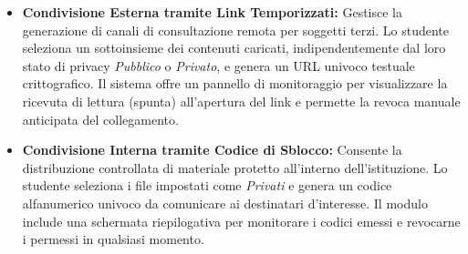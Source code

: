 \documentclass[12pt,a4paper]{article}
\newcommand{\spaziocontenuto}{\mbox{}\par\vspace{1.2cm}}
\begin{document}
\begin{itemize}
    \item \textbf{Condivisione Esterna tramite Link Temporizzati:} Gestisce la generazione di canali di consultazione remota per soggetti terzi. Lo studente seleziona un sottoinsieme dei contenuti caricati, indipendentemente dal loro stato di privacy \textit{Pubblico} o \textit{Privato}, e genera un URL univoco testuale crittografico. Il sistema offre un pannello di monitoraggio per visualizzare la ricevuta di lettura (spunta) all'apertura del link e permette la revoca manuale anticipata del collegamento.
    \item \textbf{Condivisione Interna tramite Codice di Sblocco:} Consente la distribuzione controllata di materiale protetto all'interno dell'istituzione. Lo studente seleziona i file impostati come \textit{Privati} e genera un codice alfanumerico univoco da comunicare ai destinatari d'interesse. Il modulo include una schermata riepilogativa per monitorare i codici emessi e revocarne i permessi in qualsiasi momento.
\end{itemize}

\spaziocontenuto
\end{document}
